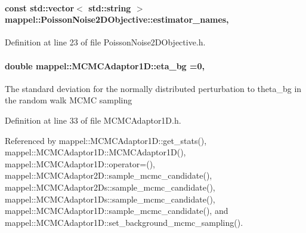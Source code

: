 \paragraph[{\texorpdfstring{estimator\+\_\+names}{estimator_names}}]{\setlength{\rightskip}{0pt plus 5cm}const std\+::vector$<$ std\+::string $>$ mappel\+::\+Poisson\+Noise2\+D\+Objective\+::estimator\+\_\+names\hspace{0.3cm}{\ttfamily [static]}, {\ttfamily [inherited]}}\hypertarget{classmappel_1_1PoissonNoise2DObjective_ac661699516dcee8b4e8a440e9b8b62d1}{}\label{classmappel_1_1PoissonNoise2DObjective_ac661699516dcee8b4e8a440e9b8b62d1}


Definition at line 23 of file Poisson\+Noise2\+D\+Objective.\+h.

\paragraph[{\texorpdfstring{eta\+\_\+bg}{eta_bg}}]{\setlength{\rightskip}{0pt plus 5cm}double mappel\+::\+M\+C\+M\+C\+Adaptor1\+D\+::eta\+\_\+bg =0\hspace{0.3cm}{\ttfamily [protected]}, {\ttfamily [inherited]}}\hypertarget{classmappel_1_1MCMCAdaptor1D_af54c93421b8e298289cbb92743c6b3d5}{}\label{classmappel_1_1MCMCAdaptor1D_af54c93421b8e298289cbb92743c6b3d5}
The standard deviation for the normally distributed perturbation to theta\+\_\+bg in the random walk M\+C\+MC sampling 

Definition at line 33 of file M\+C\+M\+C\+Adaptor1\+D.\+h.



Referenced by mappel\+::\+M\+C\+M\+C\+Adaptor1\+D\+::get\+\_\+stats(), mappel\+::\+M\+C\+M\+C\+Adaptor1\+D\+::\+M\+C\+M\+C\+Adaptor1\+D(), mappel\+::\+M\+C\+M\+C\+Adaptor1\+D\+::operator=(), mappel\+::\+M\+C\+M\+C\+Adaptor2\+D\+::sample\+\_\+mcmc\+\_\+candidate(), mappel\+::\+M\+C\+M\+C\+Adaptor2\+Ds\+::sample\+\_\+mcmc\+\_\+candidate(), mappel\+::\+M\+C\+M\+C\+Adaptor1\+Ds\+::sample\+\_\+mcmc\+\_\+candidate(), mappel\+::\+M\+C\+M\+C\+Adaptor1\+D\+::sample\+\_\+mcmc\+\_\+candidate(), and mappel\+::\+M\+C\+M\+C\+Adaptor1\+D\+::set\+\_\+background\+\_\+mcmc\+\_\+sampling().

